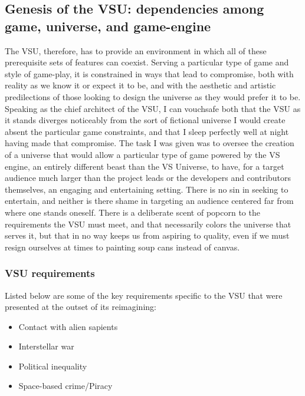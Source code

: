 

\subsection{Genesis of the VSU: dependencies among game, universe, and game-engine}
The VSU, therefore, has to provide an environment in which all of
these prerequisite sets of features can coexist. Serving a particular
type of game and style of game-play, it is constrained in ways that
lead to compromise, both with reality as we know it or expect it to
be, and with the aesthetic and artistic predilections of those looking
to design the universe as they would prefer it to be. Speaking as the
chief architect of the VSU, I can vouchsafe both that the VSU as it
stands diverges noticeably from the sort of fictional universe I would
create absent the particular game constraints, and that I sleep
perfectly well at night having made that compromise. The task I was
given was to oversee the creation of a universe that would allow a
particular type of game powered by the VS engine, an entirely
different beast than the VS Universe, to have, for a target audience
much larger than the project leads or the developers and contributors
themselves, an engaging and entertaining setting. There is no sin in
seeking to entertain, and neither is there shame in targeting an
audience centered far from where one stands oneself. There is a
deliberate scent of popcorn to the requirements the VSU must meet, and
that necessarily colors the universe that serves it, but that in no
way keeps us from aspiring to quality, even if we must resign
ourselves at times to painting soup cans instead of canvas.

\subsubsection{VSU requirements}

Listed below are some of the key requirements specific to the VSU that
were presented at the outset of its reimagining:

\begin{itemize}

\item Contact with alien sapients

\item Interstellar war

\item Political inequality

\item Space-based crime/Piracy

\end{itemize}

